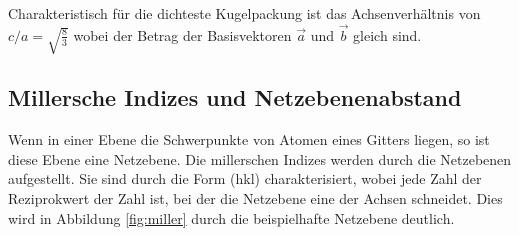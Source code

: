 Charakteristisch für die dichteste Kugelpackung ist das Achsenverhältnis von $c/a = \sqrt{\frac{8}{3}}$ wobei der Betrag der Basisvektoren $\vec{a}$ und $\vec{b}$ gleich sind.

\subsection{Millersche Indizes und Netzebenenabstand}
Wenn in einer Ebene die Schwerpunkte von Atomen eines Gitters liegen, so ist diese Ebene eine Netzebene.
Die millerschen Indizes werden durch die Netzebenen aufgestellt. 
Sie sind durch die Form (hkl) charakterisiert, wobei jede Zahl der Reziprokwert der Zahl ist, bei der die Netzebene eine der Achsen schneidet. 
Dies wird in Abbildung \ref{fig:miller} durch die beispielhafte Netzebene deutlich.

